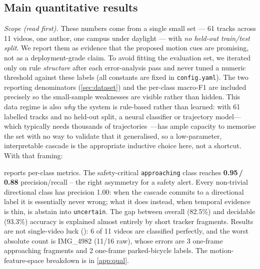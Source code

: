\documentclass[10pt,twocolumn,letterpaper]{article}
\begin{document}
\subsection{Main quantitative results}
\noindent\emph{Scope (read first).} These numbers come from a single
small set --- 61 tracks across 11 videos, one author, one campus under
daylight --- with \emph{no held-out train/test split}. We report them
as evidence that the proposed motion cues are promising, not as a
deployment-grade claim. To avoid fitting the evaluation set, we
iterated only on rule \emph{structure} after each error-analysis pass
and never tuned a numeric threshold against these labels (all constants
are fixed in \texttt{config.yaml}). The two reporting denominators
(\cref{sec:dataset}) and the per-class macro-F1 are included precisely
so the small-sample weaknesses are visible rather than hidden. This
data regime is also \emph{why} the system is rule-based rather than
learned: with 61 labelled tracks and no held-out split, a neural
classifier or trajectory model---which typically needs thousands of
trajectories~\cite{trajectronpp,socialstgcnn}---has ample capacity to
memorise the set with no way to validate that it generalised, so a
low-parameter, interpretable cascade is the appropriate inductive
choice here, not a shortcut. With that framing:

 reports per-class metrics. The safety-critical
\texttt{approaching} class reaches \textbf{0.95\,/\,0.88}
precision/recall -- the right asymmetry for a safety alert. Every
non-trivial directional class has precision 1.00: when the cascade
commits to a directional label it is essentially never wrong; what
it does instead, when temporal evidence is thin, is abstain into
\texttt{uncertain}. The gap between overall (82.5\%) and decidable
(93.3\%) accuracy is explained almost entirely by short tracker
fragments. Results are not single-video luck ():
6 of 11 videos are classified perfectly, and the worst absolute count
is IMG\_4982 (11/16 raw), whose errors are 3 one-frame approaching
fragments and 2 one-frame parked-bicycle labels. The
motion-feature-space breakdown is in \cref{app:qual}.
\end{document}

